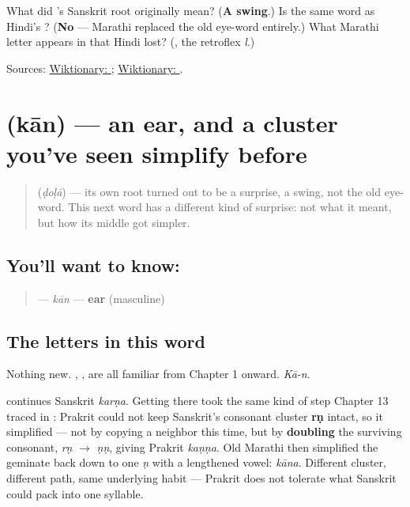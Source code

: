 \begin{tcolorbox}[breakable,colback=teal!4,colframe=teal!35!black,title={Before you move on}]
What did \textbf{}'s Sanskrit root originally mean? (\textbf{A swing}.) Is \textbf{} the same word as Hindi's \textbf{}? (\textbf{No} — Marathi replaced the old eye-word entirely.) What Marathi letter appears in \textbf{} that Hindi lost? (\textbf{}, the retroflex \emph{l}.)

Sources: \href{https://en.wiktionary.org/wiki/\%E0\%A4\%A1\%E0\%A5\%8B\%E0\%A4\%B3\%E0\%A4\%BE}{Wiktionary: }; \href{https://en.wiktionary.org/wiki/\%E0\%A4\%A6\%E0\%A5\%8B\%E0\%A4\%B2}{Wiktionary: }.
\end{tcolorbox}
\section[\texorpdfstring{\mr{कान} (kān)}{कान (kān)}]{ (kān) — an ear, and a cluster you've seen simplify before}

\label{lesson:MR-C12-kaan}



\begin{quote}
\textbf{} (\emph{ḍoḷā}) — its own root turned out to be a surprise, a swing, not the old eye-word. This next word has a different kind of surprise: not what it meant, but how its middle got simpler.
\end{quote}

\subsection*{You'll want to know: }
\begin{quote}
\textbf{} — \emph{kān} — \textbf{ear} (masculine)
\end{quote}

\subsection*{The letters in this word}
Nothing new. \textbf{}, \textbf{}, \textbf{} are all familiar from Chapter 1 onward. \emph{Kā-n}.

\begin{sounds}
\textbf{} continues Sanskrit \textbf{} \emph{karṇa}. Getting there took the same kind of step Chapter 13 traced in \textbf{}: Prakrit could not keep Sanskrit's consonant cluster \textbf{rṇ} intact, so it simplified — not by copying a neighbor this time, but by \textbf{doubling} the surviving consonant, \emph{rṇ} $\to$ \emph{ṇṇ}, giving Prakrit \textbf{} \emph{kaṇṇa}. Old Marathi then simplified the geminate back down to one \emph{ṇ} with a lengthened vowel: \emph{kāna}. Different cluster, different path, same underlying habit — Prakrit does not tolerate what Sanskrit could pack into one syllable.
\end{sounds}


